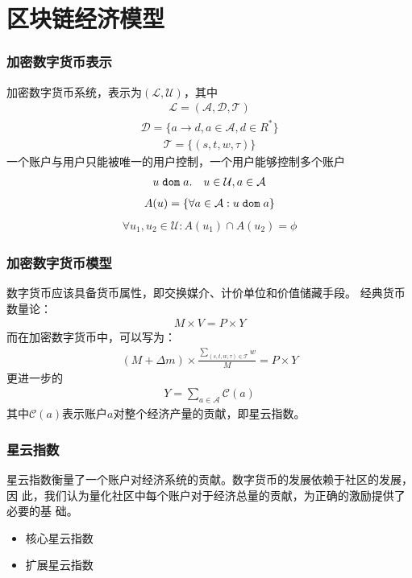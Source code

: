 
\section{区块链经济模型}
\begin{frame}
	\frametitle{加密数字货币表示}
  加密数字货币系统，表示为$(\mathcal{L}, \mathcal{U})$，其中
  \begin{align}
  \mathcal{L} = (\mathcal{A}, \mathcal{D}, \mathcal{T})
  \end{align}
  \begin{align}
  \mathcal{D} = \{a \rightarrow d, a{\in}\mathcal{A}, d{\in}R^*\}
  \end{align}
  \begin{align}
  \mathcal{T} = \{(s, t, w, \tau)\}
  \end{align}
一个账户与用户只能被唯一的用户控制，一个用户能够控制多个账户
\begin{align}
u {\; \texttt{dom}\;} a. \quad u\in \mathcal{U}, a\in \mathcal{A}
\end{align}
\begin{align}
A(u) = \{\forall a\in \mathcal{A} : u {\; \texttt{dom}\;} a\}
\end{align}
\begin{align}
\forall u_1, u_2 \in \mathcal{U} : A(u_1) \cap A(u_2) = \phi
\end{align}
\end{frame}

\begin{frame}
\frametitle{加密数字货币模型}
数字货币应该具备货币属性，即交换媒介、计价单位和价值储藏手段。
经典货币数量论：
\begin{align}
M\times V=P\times Y
\label{eq:currency}
\end{align}
而在加密数字货币中，可以写为：
\begin{align}
(M + \Delta{m}) \times \frac{\sum_{(s, t, w, \tau)\in \mathcal{T}}{w}}{M} = P \times Y
\label{eq:cur_ext}
\end{align}
更进一步的
\begin{align}
Y=\sum_{a\in \mathcal{A}} \mathcal{C}(a)
\end{align}
\noindent 其中$\mathcal{C}(a)$表示账户$a$对整个经济产量的贡献，即星云指数。
\end{frame}

\begin{frame}
\frametitle{星云指数}
星云指数衡量了一个账户对经济系统的贡献。数字货币的发展依赖于社区的发展，因
此，我们认为量化社区中每个账户对于经济总量的贡献，为正确的激励提供了必要的基
础。
\begin{itemize}[<+->]
\item 核心星云指数
\item 扩展星云指数
\end{itemize}
\end{frame}
